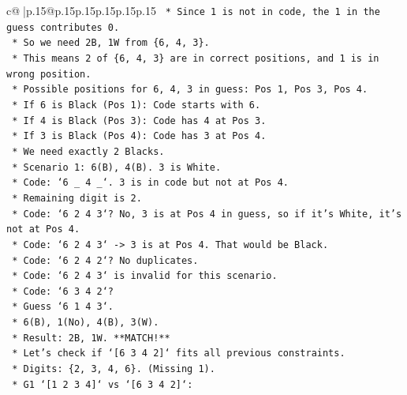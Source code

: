 \documentclass{article}
\begin{document}
{\begin{supertabular}{c@{$\;$}|p{.15\linewidth}@{}p{.15\linewidth}p{.15\linewidth}p{.15\linewidth}p{.15\linewidth}p{.15\linewidth}}
{{{\texttt{                *   Since 1 is not in code, the 1 in the guess contributes 0.} \\
\texttt{                *   So we need 2B, 1W from \{6, 4, 3\}.} \\
\texttt{                *   This means 2 of \{6, 4, 3\} are in correct positions, and 1 is in wrong position.} \\
\texttt{                *   Possible positions for 6, 4, 3 in guess: Pos 1, Pos 3, Pos 4.} \\
\texttt{                *   If 6 is Black (Pos 1): Code starts with 6.} \\
\texttt{                *   If 4 is Black (Pos 3): Code has 4 at Pos 3.} \\
\texttt{                *   If 3 is Black (Pos 4): Code has 3 at Pos 4.} \\
\texttt{                *   We need exactly 2 Blacks.} \\
\texttt{                *   Scenario 1: 6(B), 4(B). 3 is White.} \\
\texttt{                    *   Code: `6 \_ 4 \_`. 3 is in code but not at Pos 4.} \\
\texttt{                    *   Remaining digit is 2.} \\
\texttt{                    *   Code: `6 2 4 3`? No, 3 is at Pos 4 in guess, so if it's White, it's not at Pos 4.} \\
\texttt{                    *   Code: `6 2 4 3` {-}> 3 is at Pos 4. That would be Black.} \\
\texttt{                    *   Code: `6 2 4 2`? No duplicates.} \\
\texttt{                    *   Code: `6 2 4 3` is invalid for this scenario.} \\
\texttt{                    *   Code: `6 3 4 2`?} \\
\texttt{                        *   Guess `6 1 4 3`.} \\
\texttt{                        *   6(B), 1(No), 4(B), 3(W).} \\
\texttt{                        *   Result: 2B, 1W. **MATCH!**} \\
\texttt{                    *   Let's check if `{[}6 3 4 2{]}` fits all previous constraints.} \\
\texttt{                        *   Digits: \{2, 3, 4, 6\}. (Missing 1).} \\
\texttt{                        *   G1 `{[}1 2 3 4{]}` vs `{[}6 3 4 2{]}`:} \\
}}}
\end{supertabular}}
\end{document}
